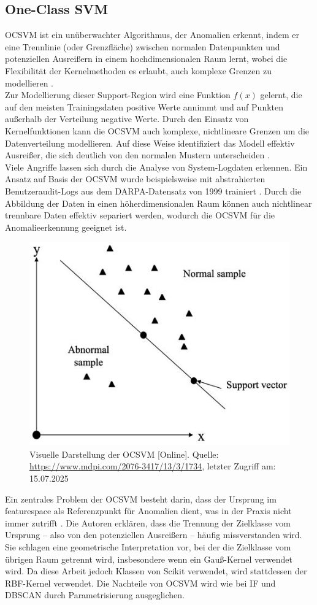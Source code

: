 \documentclass[a4paper,12pt]{article}
\begin{document}
	\subsection{One-Class SVM}
	OCSVM ist ein unüberwachter Algorithmus, der Anomalien erkennt, indem er eine Trennlinie (oder Grenzfläche) zwischen normalen Datenpunkten und potenziellen Ausreißern in einem hochdimensionalen Raum lernt, wobei die Flexibilität der Kernelmethoden es erlaubt, auch komplexe Grenzen zu modellieren \cite{Yang2021}.
	\\[0.5em]
	Zur Modellierung dieser Support-Region wird eine Funktion \(f(x)\) gelernt, die auf den meisten Trainingsdaten positive Werte annimmt und auf Punkten außerhalb der Verteilung negative Werte. Durch den Einsatz von Kernelfunktionen kann die OCSVM auch komplexe, nichtlineare Grenzen um die Datenverteilung modellieren. Auf diese Weise identifiziert das Modell effektiv Ausreißer, die sich deutlich von den normalen Mustern unterscheiden \cite[S.6]{Scholkopf2001}.
	\\[0.5em]
	Viele Angriffe lassen sich durch die Analyse von System-Logdaten erkennen. Ein Ansatz auf Basis der OCSVM wurde beispielsweise mit abstrahierten Benutzeraudit-Logs aus dem DARPA-Datensatz von 1999 trainiert \cite{li2003improving}. Durch die Abbildung der Daten in einen höherdimensionalen Raum können auch nichtlinear trennbare Daten effektiv separiert werden, wodurch die OCSVM für die Anomalieerkennung geeignet ist.
	\\[0.5em]
	\begin{figure}[H]
		\centering
		\includegraphics[width=0.7\linewidth]{Bilder/screenshot006}
		\caption{Visuelle Darstellung der OCSVM [Online]. Quelle: \url{https://www.mdpi.com/2076-3417/13/3/1734}, letzter Zugriff am: 15.07.2025}
		\label{fig:screenshot006}
	\end{figure}
	Ein zentrales Problem der OCSVM besteht darin, dass der Ursprung im \gls{featurespace} als Referenzpunkt für Anomalien dient, was in der Praxis nicht immer zutrifft \cite{bounsiar2014oneclass}. Die Autoren erklären, dass die Trennung der Zielklasse vom Ursprung – also von den potenziellen Ausreißern – häufig missverstanden wird. Sie schlagen eine geometrische Interpretation vor, bei der die Zielklasse vom übrigen Raum getrennt wird, insbesondere wenn ein Gauß-Kernel verwendet wird. Da diese Arbeit jedoch Klassen von Scikit verwendet, wird stattdessen der RBF-Kernel verwendet. Die Nachteile von OCSVM wird wie bei IF und DBSCAN durch Parametrisierung ausgeglichen.
	
\end{document}
